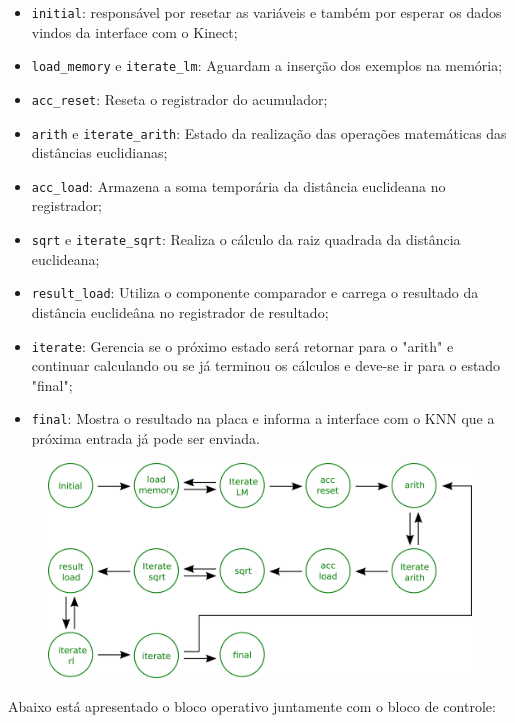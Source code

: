 \documentclass[12pt]{article}
\begin{document}
\begin{itemize}
\item \verb|initial|: responsável por resetar as variáveis e também por esperar os dados vindos da interface com o Kinect;
\item \verb|load_memory| e \verb|iterate_lm|: Aguardam a inserção dos exemplos na memória;
\item \verb|acc_reset|: Reseta o registrador do acumulador;
\item \verb|arith| e \verb|iterate_arith|: Estado da realização das operações matemáticas das distâncias euclidianas;
\item \verb|acc_load|: Armazena a soma temporária da distância euclideana no registrador;
\item \verb|sqrt| e \verb|iterate_sqrt|: Realiza o cálculo da raiz quadrada da distância euclideana;
\item \verb|result_load|: Utiliza o componente comparador e carrega o resultado da distância euclideâna no registrador de resultado;
\item \verb|iterate|: Gerencia se o próximo estado será retornar para o "arith" e continuar calculando ou se já terminou os cálculos 
e deve-se ir para o estado "final";
\item \verb|final|: Mostra o resultado na placa e informa a interface com o KNN que a próxima entrada já pode ser enviada.
\end{itemize}

\begin{figure}[!ht]
\centering
\includegraphics[scale=0.2]{img/control_unit.png}
\end{figure}

\newpage

Abaixo está apresentado o bloco operativo juntamente com o bloco de controle:
\end{document}
